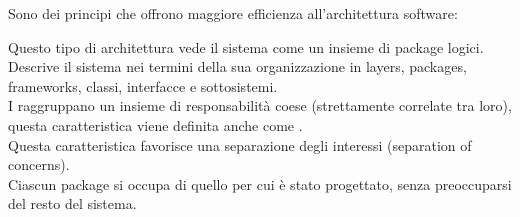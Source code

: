 {    
    Sono dei principi che offrono maggiore efficienza all'architettura software:
    \begin{center}
    \end{center}

    Questo tipo di architettura vede il sistema come un insieme di package logici. Descrive il sistema nei termini della
    sua organizzazione in layers, packages, frameworks, classi, interfacce e sottosistemi.
    \\
    I\textbf{ } raggruppano un insieme di responsabilità coese
    (strettamente correlate tra loro), questa caratteristica viene definita anche come
    \textbf{ }.
    \\
    Questa caratteristica favorisce una separazione degli interessi (separation of concerns).
    \\
    Ciascun package si occupa di quello per cui è stato progettato, senza preoccuparsi del resto del sistema.

}
